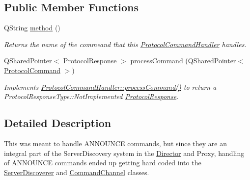 \subsection*{Public Member Functions}
\begin{DoxyCompactItemize}
\item 
\hypertarget{struct_picto_1_1_announce_command_handler_a47a3a63035f6417c34deb9bcf552c76f}{Q\-String \hyperlink{struct_picto_1_1_announce_command_handler_a47a3a63035f6417c34deb9bcf552c76f}{method} ()}\label{struct_picto_1_1_announce_command_handler_a47a3a63035f6417c34deb9bcf552c76f}

\begin{DoxyCompactList}\small\item\em Returns the name of the commeand that this \hyperlink{struct_picto_1_1_protocol_command_handler}{Protocol\-Command\-Handler} handles. \end{DoxyCompactList}\item 
\hypertarget{struct_picto_1_1_announce_command_handler_a9423c23630f252536100323ae6ff8051}{Q\-Shared\-Pointer$<$ \hyperlink{struct_picto_1_1_protocol_response}{Protocol\-Response} $>$ \hyperlink{struct_picto_1_1_announce_command_handler_a9423c23630f252536100323ae6ff8051}{process\-Command} (Q\-Shared\-Pointer$<$ \hyperlink{struct_picto_1_1_protocol_command}{Protocol\-Command} $>$)}\label{struct_picto_1_1_announce_command_handler_a9423c23630f252536100323ae6ff8051}

\begin{DoxyCompactList}\small\item\em Implements \hyperlink{struct_picto_1_1_protocol_command_handler_aeeaa16fe40f10fd55996d74e16e29cad}{Protocol\-Command\-Handler\-::process\-Command()} to return a Protocol\-Response\-Type\-::\-Not\-Implemented \hyperlink{struct_picto_1_1_protocol_response}{Protocol\-Response}. \end{DoxyCompactList}\end{DoxyCompactItemize}


\subsection{Detailed Description}
This was meant to handle A\-N\-N\-O\-U\-N\-C\-E commands, but since they are an integral part of the Server\-Discovery system in the \hyperlink{class_director}{Director} and Proxy, handling of A\-N\-N\-O\-U\-N\-C\-E commands ended up getting hard coded into the \hyperlink{struct_picto_1_1_server_discoverer}{Server\-Discoverer} and \hyperlink{class_picto_1_1_command_channel}{Command\-Channel} classes. 

